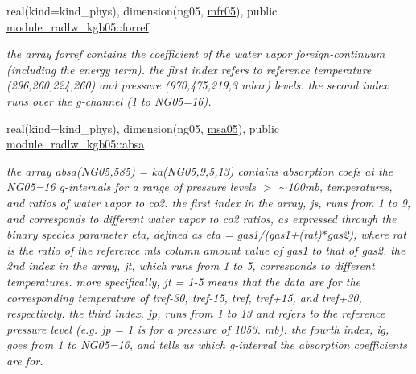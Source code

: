 \begin{DoxyCompactItemize}
\mbox{\label{group__module__radlw__kgbnn_ga6ff0c311db14b41c9bdf1170164adc3a}} 
real(kind=kind\+\_\+phys), dimension(ng05, \hyperlink{group__module__radlw__kgbnn_ga44f07da9a7f99377f7d331249c475b80}{mfr05}), public \hyperlink{group__module__radlw__kgbnn_ga6ff0c311db14b41c9bdf1170164adc3a}{module\+\_\+radlw\+\_\+kgb05\+::forref}
\begin{DoxyCompactList}\small\item\em the array forref contains the coefficient of the water vapor foreign-\/continuum (including the energy term). the first index refers to reference temperature (296,260,224,260) and pressure (970,475,219,3 mbar) levels. the second index runs over the g-\/channel (1 to N\+G05=16). \end{DoxyCompactList}\item 
\mbox{\label{group__module__radlw__kgbnn_ga30ce809b40dd99b3219996ac8f023274}} 
real(kind=kind\+\_\+phys), dimension(ng05, \hyperlink{namespacemodule__radlw__kgb05_a79c5177c6d0e56a69f4d1a0704879539}{msa05}), public \hyperlink{group__module__radlw__kgbnn_ga30ce809b40dd99b3219996ac8f023274}{module\+\_\+radlw\+\_\+kgb05\+::absa}
\begin{DoxyCompactList}\small\item\em the array absa(\+N\+G05,585) = ka(\+N\+G05,9,5,13) contains absorption coefs at the N\+G05=16 g-\/intervals for a range of pressure levels $>$ $\sim$100mb, temperatures, and ratios of water vapor to co2. the first index in the array, js, runs from 1 to 9, and corresponds to different water vapor to co2 ratios, as expressed through the binary species parameter eta, defined as eta = gas1/(gas1+(rat)$\ast$gas2), where rat is the ratio of the reference mls column amount value of gas1 to that of gas2. the 2nd index in the array, jt, which runs from 1 to 5, corresponds to different temperatures. more specifically, jt = 1-\/5 means that the data are for the corresponding temperature of tref-\/30, tref-\/15, tref, tref+15, and tref+30, respectively. the third index, jp, runs from 1 to 13 and refers to the reference pressure level (e.\+g. jp = 1 is for a pressure of 1053. mb). the fourth index, ig, goes from 1 to N\+G05=16, and tells us which g-\/interval the absorption coefficients are for. \end{DoxyCompactList}\item 
\mbox{\label{group__module__radlw__kgbnn_gaebc667b0569824bba455e822eaea6112}} 

\end{DoxyCompactItemize}

